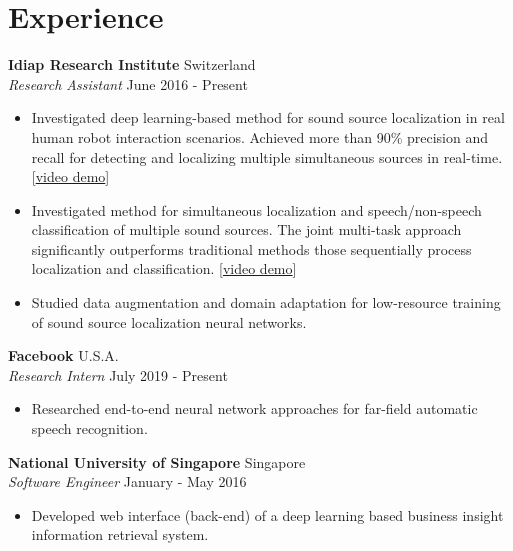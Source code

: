 \documentclass[a4paper,10pt]{article} %
\begin{document}

\section{Experience}

\textbf{Idiap Research Institute}  \hfill Switzerland \\
\textit{Research Assistant} \hfill June 2016 - Present
\vspace{-.9\parskip}
\begin{itemize}
  \item Investigated deep learning-based method for sound source localization in real human robot interaction scenarios. Achieved more than 90\% precision and recall for detecting and localizing multiple simultaneous sources in real-time.
    [\href{https://www.youtube.com/watch?v=_4EwuVlE_pU}{video demo}]
  \item Investigated method for simultaneous localization and speech/non-speech classification of multiple sound sources. The joint multi-task approach significantly outperforms traditional methods those sequentially process localization and classification.
    [\href{https://www.youtube.com/watch?v=O7bQvg03RTc}{video demo}]
  \item Studied data augmentation and domain adaptation for low-resource training of sound source localization neural networks.
\end{itemize}


\textbf{Facebook}  \hfill U.S.A. \\
\textit{Research Intern} \hfill July 2019 - Present
\vspace{-.9\parskip}
\begin{itemize}
  \item Researched end-to-end neural network approaches for far-field automatic speech recognition.
\end{itemize}


\textbf{National University of Singapore}  \hfill Singapore \\
\textit{Software Engineer} \hfill January - May 2016
\vspace{-.9\parskip}
\begin{itemize}
  \item Developed web interface (back-end) of a deep learning based business insight information retrieval system.
\end{itemize}
\end{document}
